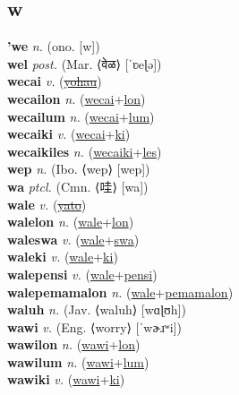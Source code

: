 \subsection{w}

\textbf{'we} \textit{n.} (ono. [w])
 \label{'we} \\
\textbf{wel} \textit{post.} (Mar. ⟨वेळ⟩ [ˈʋeɭə])
 \label{wel} \\
\textbf{wecai} \textit{v.} (\hyperref[yohau]{\sout{yohau}})
 \label{wecai} \\
\textbf{wecailon} \textit{n.} (\hyperref[wecai]{wecai}+\hyperref[lon]{lon})
 \label{wecailon} \\
\textbf{wecailum} \textit{n.} (\hyperref[wecai]{wecai}+\hyperref[lum]{lum})
 \label{wecailum} \\
\textbf{wecaiki} \textit{v.} (\hyperref[wecai]{wecai}+\hyperref[ki]{ki})
 \label{wecaiki} \\
\textbf{wecaikiles} \textit{n.} (\hyperref[wecaiki]{wecaiki}+\hyperref[les]{les})
 \label{wecaikiles} \\
\textbf{wep} \textit{n.} (Ibo. ⟨wep⟩ [wep])
 \label{wep} \\
\textbf{wa} \textit{ptcl.} (Cmn. ⟨哇⟩ [wa])
 \label{wa} \\
\textbf{wale} \textit{v.} (\hyperref[yato]{\sout{yato}})
 \label{wale} \\
\textbf{walelon} \textit{n.} (\hyperref[wale]{wale}+\hyperref[lon]{lon})
 \label{walelon} \\
\textbf{waleswa} \textit{v.} (\hyperref[wale]{wale}+\hyperref[swa]{swa})
 \label{waleswa} \\
\textbf{waleki} \textit{v.} (\hyperref[wale]{wale}+\hyperref[ki]{ki})
 \label{waleki} \\
\textbf{walepensi} \textit{v.} (\hyperref[wale]{wale}+\hyperref[pensi]{pensi})
 \label{walepensi} \\
\textbf{walepemamalon} \textit{n.} (\hyperref[wale]{wale}+\hyperref[pemamalon]{pemamalon})
 \label{walepemamalon} \\
\textbf{waluh} \textit{n.} (Jav. ⟨waluh⟩ [wɑɭʊh])
 \label{waluh} \\
\textbf{wawi} \textit{v.} (Eng. ⟨worry⟩ [ˈwɚɹʷi])
 \label{wawi} \\
\textbf{wawilon} \textit{n.} (\hyperref[wawi]{wawi}+\hyperref[lon]{lon})
 \label{wawilon} \\
\textbf{wawilum} \textit{n.} (\hyperref[wawi]{wawi}+\hyperref[lum]{lum})
 \label{wawilum} \\
\textbf{wawiki} \textit{v.} (\hyperref[wawi]{wawi}+\hyperref[ki]{ki})
